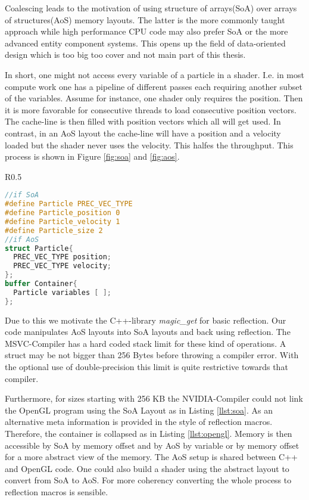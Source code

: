 \documentclass[m,times]{cgMA}
\begin{document}
Coalescing leads to the motivation of using structure of arrays(SoA) over arrays of structures(AoS) memory layouts. The latter is the more commonly taught approach while high performance CPU code may also prefer SoA or the more advanced entity component systems. This opens up the field of data-oriented design which is too big too cover and not main part of this thesis.

In short, one might not access every variable of a particle in a shader. I.e. in most compute work one has a pipeline of different passes each requiring another subset of the variables. Assume for instance, one shader only requires the position. Then it is more favorable for consecutive threads to load consecutive position vectors. The cache-line is then filled with position vectors which all will get used. In contrast, in an AoS layout the cache-line will have a position and a velocity loaded but the shader never uses the velocity. This halfes the throughput. This process is shown in Figure \ref{fig:soa} and \ref{fig:aos}.

\noindent\begin{wrapfigure}{R}{0.5\textwidth}
\hfill\begin{minipage}{0.45\textwidth}
\begin{lstlisting}[caption={OpenGL Layout},label={llst:opengl},language={GLSL},style={GL}]
//if SoA
#define Particle PREC_VEC_TYPE
#define Particle_position 0
#define Particle_velocity 1
#define Particle_size 2
//if AoS
struct Particle{
  PREC_VEC_TYPE position;
  PREC_VEC_TYPE velocity;
};
buffer Container{
  Particle variables [ ];
};
\end{lstlisting}
\end{minipage}
\end{wrapfigure}

Due to this we motivate the C++-library \textit{magic\_get} \cite{APOLUKHIN:MAGIC_GET} for basic reflection. Our code manipulates AoS layouts into SoA layouts and back using reflection. The MSVC-Compiler has a hard coded stack limit for these kind of operations. A struct may be not bigger than 256 Bytes before throwing a compiler error. With the optional use of double-precision this limit is quite restrictive towards that compiler.

Furthermore, for sizes starting with 256 KB the NVIDIA-Compiler could not link the OpenGL program using the SoA Layout as in Listing \ref{llst:soa}. As an alternative meta information is provided in the style of reflection macros. Therefore, the container is collapsed as in Listing \ref{llst:opengl}. Memory is then accessible by SoA by memory offset and by AoS by variable or by memory offset for a more abstract view of the memory. The AoS setup is shared between C++ and OpenGL code. One could also build a shader using the abstract layout to convert from SoA to AoS. For more coherency converting the whole process to reflection macros is sensible.
\end{document}
